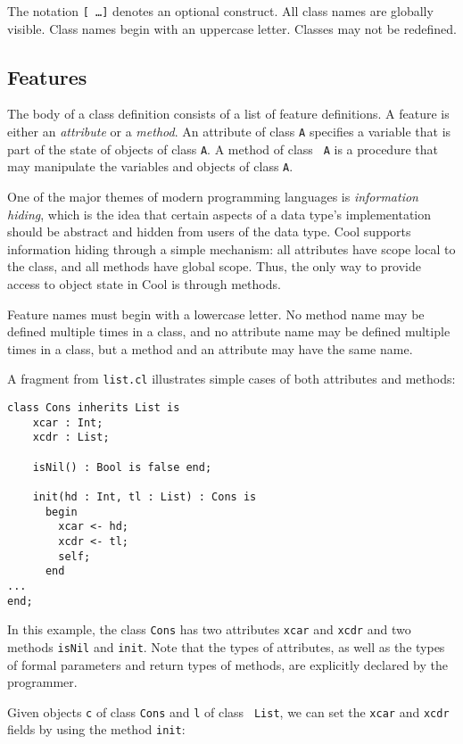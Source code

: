 The notation {\tt [ \ldots ]} denotes an optional construct.
All class names are globally visible.  Class names begin with an
uppercase letter.  Classes may not be redefined.

\subsection{Features}

The body of a class definition consists of a list of feature
definitions.  A feature is either an {\em attribute} or a {\em
method}.  An attribute of class {\tt A} specifies a variable that is
part of the state of objects of class {\tt A}.  A method of class {\tt
A} is a procedure that may manipulate the variables and objects of class {\tt A}.

One of the major themes of modern programming languages is {\em
information hiding}, which is the idea that certain aspects of a data
type's implementation should be abstract and hidden from users of the
data type.  Cool supports information hiding through a simple
mechanism: all attributes have scope local to the class, and all
methods have global scope.  Thus, the only way to provide access to
object state in Cool is through methods.

Feature names must begin with a lowercase letter.  No method name
may be defined multiple times in a class, and no attribute name
may be defined multiple times in a class, but a method and an attribute
may have the same name.

A fragment from {\tt list.cl} illustrates simple cases of both attributes
and methods:

\begin{verbatim}
class Cons inherits List is
	xcar : Int;
	xcdr : List;

	isNil() : Bool is false end;

	init(hd : Int, tl : List) : Cons is
	  begin
	    xcar <- hd;
	    xcdr <- tl;
	    self;
	  end
...
end;
\end{verbatim}
In this example, the class {\tt Cons} has two attributes {\tt xcar} and
{\tt xcdr} and two methods {\tt isNil} and {\tt init}.  Note that the types
of attributes, as well as the types of formal parameters and return types
of methods, are explicitly declared by the programmer.  

Given objects {\tt c} of class {\tt Cons} and {\tt l} of class {\tt
List}, we can set the {\tt xcar} and {\tt xcdr} fields by using the
method {\tt init}:

